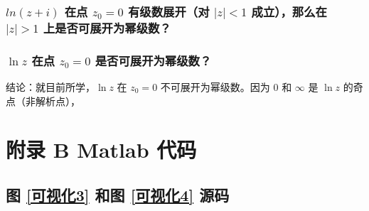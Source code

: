 \documentclass[UTF8]{report}
\theoremstyle{MyLineTheoremStyle} %
\theoremstyle{MyBlockTheoremStyle} %
\theoremstyle{MySubsubsectionStyle} %
\begin{document}
\subsection{$ln (z + i)$ 在点 $z_0 = 0$ 有级数展开（对 $| z | < 1$ 成立），那么在 $| z | > 1 $ 上是否可展开为幂级数？}

\subsection{$\ln z$ 在点 $z_0 = 0$ 是否可展开为幂级数？}
结论：就目前所学，$\ln z$ 在 $z_0 = 0$ 不可展开为幂级数。因为 $0$ 和 $\infty$ 是 $\ln z$ 的奇点（非解析点），

\chapter*{附录 B\hspace*{20pt}  Matlab 代码}
\thispagestyle{fancy}
\setcounter{chapter}{2} 
\setcounter{equation}{0}    %
\setcounter{section}{0}   
\renewcommand\thesection{B.\arabic{section}}   
\renewcommand{\thefigure}{B.\arabic{figure}} 
\renewcommand{\thetable}{B.\arabic{table}}

\section{图 \ref{可视化3} 和图 \ref{可视化4} 源码}
\label{可视化34 源码}


\end{document}

